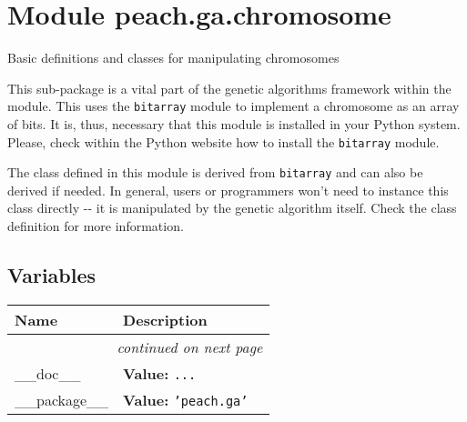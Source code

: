 %
%
%


\section{Module peach.ga.chromosome}

    \label{peach:ga:chromosome}

Basic definitions and classes for manipulating chromosomes

This sub-package is a vital part of the genetic algorithms framework within the
module. This uses the \texttt{bitarray} module to implement a chromosome as an array
of bits. It is, thus, necessary that this module is installed in your Python
system. Please, check within the Python website how to install the \texttt{bitarray}
module.

The class defined in this module is derived from \texttt{bitarray} and can also be
derived if needed. In general, users or programmers won't need to instance this
class directly -{}- it is manipulated by the genetic algorithm itself. Check the
class definition for more information.


  \subsection{Variables}

    \vspace{-1cm}
\hspace{\varindent}\begin{longtable}{|p{\varnamewidth}|p{\vardescrwidth}|l}
\cline{1-2}
\cline{1-2} \centering \textbf{Name} & \centering \textbf{Description}& \\
\cline{1-2}
\endhead\cline{1-2}\multicolumn{3}{r}{\small\textit{continued on next page}}\\\endfoot\cline{1-2}
\endlastfoot\raggedright \_\-\_\-d\-o\-c\-\_\-\_\- & \raggedright \textbf{Value:} 
{\tt \texttt{...}}&\\
\cline{1-2}
\raggedright \_\-\_\-p\-a\-c\-k\-a\-g\-e\-\_\-\_\- & \raggedright \textbf{Value:} 
{\tt \texttt{'}\texttt{peach.ga}\texttt{'}}&\\
\cline{1-2}
\end{longtable}


